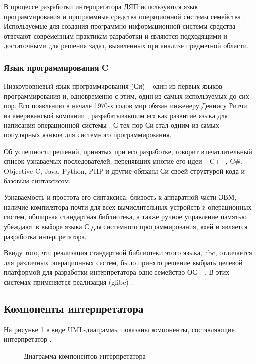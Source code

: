 В процессе разработки интерпретатора ДЯП используются язык программирования  и программные средства операционной системы семейства . Используемые для создания программно-информационной системы средства отвечают современным практикам разработки и являются подходящими и достаточными для решения задач, выявленных при анализе предметной области.

\subsubsection{Язык программирования C}

Низкоуровневый язык программирования  (Си) -- один из первых языков программирования и, одновременно с этим, один из самых используемых до сих пор. Его появлению в начале 1970-х годов мир обязан инженеру Деннису Ритчи из американской компании , разрабатывавшим его как развитие языка  для написания операционной системы  \cite{e7}. С тех пор Си стал одним из самых популярных языков для системного программирования.

Об успешности решений, принятых при его разработке, говорит впечатлительный список узнаваемых последователей, перенявших многие его идеи -- C++, C\#, Objective-C, Java, Python, PHP и другие обязаны Си своей структурой кода и базовым синтаксисом.

Узнаваемость и простота его синтаксиса, близость к аппаратной части ЭВМ, наличие компилятора почти для всех вычислительных устройств и операционных систем, обширная стандартная библиотека, а также ручное управление памятью убеждают в выборе языка С для системного программирования, коей и является разработка интерпретатора.

Ввиду того, что реализация стандартной библиотеки этого языка, libc, отличается для различных операционных систем, было принято решение выбрать целевой платформой для разработки интерпретатора одно семейство ОС -- . В этих системах применяется реализация  (glibc) \cite{e13}.


\subsection{Компоненты интерпретатора}

На рисунке \ref{interp_archit:image} в виде UML-диаграммы показаны компоненты, составляющие интерпретатор \cite{e26}.

\begin{figure}[ht]
	\caption{Диаграмма компонентов интерпретатора}
	\label{interp_archit:image}
\end{figure}

